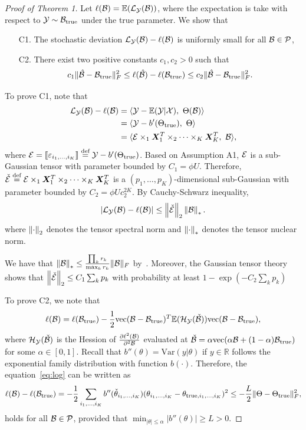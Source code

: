 \documentclass[11pt]{article}
\theoremstyle{plain}
\theoremstyle{definition}
\begin{document}
\begin{proof}[Proof of Theorem 1]

Let $\ell(\mathcal{B})=\mathbb{E}(\mathcal{L}_{\mathcal{Y}}(\mathcal{B}))$, where the expectation is take with respect to $\mathcal{Y}\sim \mathcal{B}_{\text{true}}$ under the true parameter. We show that 
\begin{enumerate}
\item[C1.] The stochastic deviation $\mathcal{L}_{\mathcal{Y}}(\mathcal{B})-\ell(\mathcal{B})$ is uniformly small for all $\mathcal{B}\in\mathcal{P}$,
\item[C2.] There exist two positive constants $c_1, c_2>0$ such that 
\[
c_1 \lVert\hat {\mathcal{B}}-\mathcal{B}_{\text{true}}\rVert_F^2 \leq \ell(\hat {\mathcal{B}}) - \ell(\mathcal{B}_{\text{true}}) \leq  c_2\lVert\hat {\mathcal{B}}-\mathcal{B}_{\text{true}}\rVert_F^2.
\]
\end{enumerate}

To prove C1, note that 
\begin{align}
\tL_{\tY}(\tB)-\ell(\tB)&=\langle \tY-\mathbb{E}(\tY|\tX),\ \Theta(\tB)\rangle\\
&= \langle \tY- b'(\trueT),\ \Theta\rangle \\
&= \langle \tE\times_1\mX^T_1\times_2\cdots\times_K\mX^T_K,\ \tB\rangle,
\end{align}
where $\mathcal{E}=\llbracket \varepsilon_{i_1,\ldots,i_K} \rrbracket\stackrel{\text{def}}{=}\mathcal{Y}-b'(\Theta_{\text{true}})$. Based on Assumption A1, $\mathcal{E}$ is a sub-Gaussian tensor with parameter bounded by $C_1=\phi U$. Therefore, $\check{\mathcal{E}}\stackrel{\text{def}}{=}\mathcal{E}\times_1\bm X^T_1\times_2\cdots\times_K\bm X^T_K$ is a $(p_1,\ldots,p_K)$-dimensional sub-Gaussian with parameter bounded by $C_2=\phi Uc^{2K}_2$. By Cauchy-Schwarz inequality,
\[
|\mathcal{L}_{\mathcal{Y}}(\mathcal{B})-\ell(\mathcal{B})|\leq \left\lVert\check {\mathcal{E}}\right\rVert_2 \left\lVert\mathcal{B}\right\rVert_*.
\]
where $\left\lVert\cdot\right\rVert_2$ denotes the tensor spectral norm and $\left\lVert\cdot\right\rVert_*$ denotes the tensor nuclear norm. 

We have that $\left\lVert\mathcal{B}\right\rVert_*\leq {\prod_k r_k \over \max_k r_k}\lVert\mathcal{B}\rVert_F$ by~\cite{wang2018learning,wang2017operator}.
Moreover, the Gaussian tensor theory~\cite{tomioka2014spectral} shows that $\left\lVert\check {\mathcal{E}}\right\rVert_2\leq C_1\sum_k p_k$ with probability at least $1-\exp(-C_2\sum_kp_k)$

To prove C2, we note that 
\begin{equation}\label{eq:log}
\ell(\mathcal{B})=\ell(\mathcal{B}_{\text{true}})-{1\over 2}\text{vec}(\mathcal{B}-\mathcal{B}_{\text{true}})^T\mathbb{E}(\mathcal{H}_{\mathcal{Y}}(\check {\mathcal{B}}))\text{vec}(\mathcal{B}-\mathcal{B}_{\text{true}}),
\end{equation}
where $\mathcal{H}_{\mathcal{Y}}(\check {\mathcal{B}})$ is the Hession of ${\partial \ell^2 (\mathcal{B})\over\partial^2 \mathcal{B}}$ evaluated at $\check {\mathcal{B}} =\alpha \text{vec}(\alpha \mathcal{B}+(1-\alpha)\mathcal{B}_{\text{true}})$ for some $\alpha\in[0,1]$. Recall that $b''(\theta)=\text{Var}(y|\theta)$ if $y\in\mathbb{R}$ follows the exponential family distribution with function $b(\cdot)$. Therefore, the equation~\eqref{eq:log} can be written as
\[
\ell(\mathcal{B})-\ell(\mathcal{B}_{\text{true}})=-{1\over 2}\sum_{i_1,\ldots,i_K}b''(\check \theta_{i_1,\ldots,i_K}) (\theta_{i_1,\ldots,i_K}-\theta_{\text{true},i_1,\ldots,i_K})^2 \leq -{L \over 2}\lVert\Theta-\Theta_{\text{true}}\rVert_F^2,
\]
holds for all $\mathcal{B}\in\mathcal{P}$, provided that $\min_{|\theta|\leq \alpha}|b''(\theta)|\geq L>0$.


\end{proof}
\end{document}
